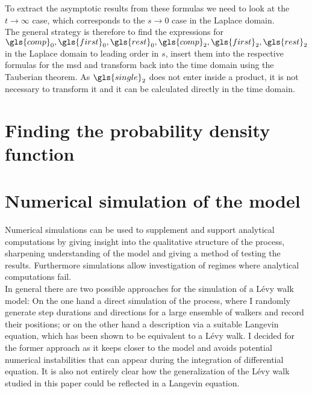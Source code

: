 To extract the asymptotic results from these formulas we need to look at the $t \to \infty$ case, which corresponds to the $s \to 0$ case in the Laplace domain. \\
The general strategy is therefore to find the expressions for $\gls{comp}_0, \gls{first}_0, \gls{rest}_0, \gls{comp}_2, \gls{first}_2, \gls{rest}_2$ in the Laplace domain to leading order in $s$, insert them into the respective formulas for the \gls{msd} and transform back into the time domain using the Tauberian theorem. As $\gls{single}_2$ does not enter inside a product, it is not necessary to transform it and it can be calculated directly in the time domain.


\section{Finding the probability density function}

\section{Numerical simulation of the model}

Numerical simulations can be used to supplement and support analytical computations by giving insight into the qualitative structure of the process, sharpening understanding of the model and giving a method of testing the results. Furthermore simulations allow investigation of regimes where analytical computations fail.\\
{\color{blue}
In general there are two possible approaches for the simulation of a L\'evy walk model: On the one hand a direct simulation of the process, where I randomly generate step durations and directions for a large ensemble of walkers and record their positions; or on the other hand a description via a suitable Langevin equation, which has been shown to be equivalent to a L\'evy walk. 
I decided for the former approach as it keeps closer to the model and avoids potential numerical instabilities that can appear during the integration of differential equation. It is also not entirely clear how the generalization of the L\'evy walk studied in this paper could be reflected in a Langevin equation. \\
}

